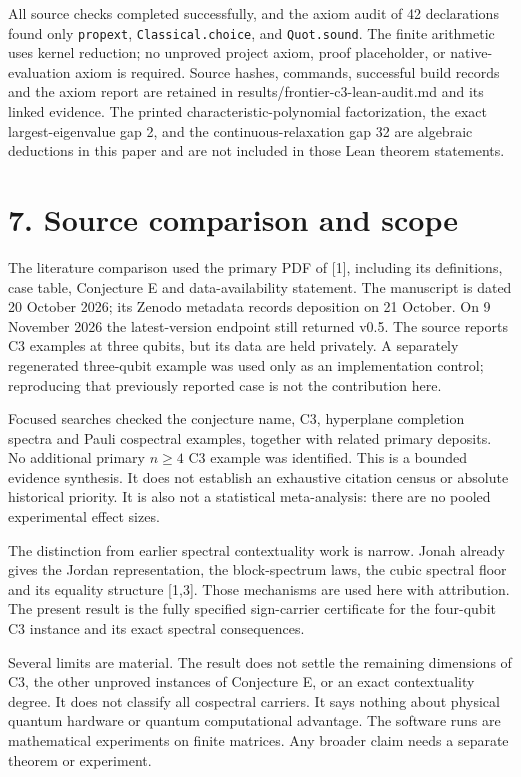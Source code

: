 \documentclass[11pt,letterpaper]{article}
\begin{document}
All source checks completed successfully, and the axiom audit of 42 declarations found only \texttt{propext}, \texttt{Classical.choice}, and \texttt{Quot.sound}. The finite arithmetic uses kernel reduction; no unproved project axiom, proof placeholder, or native-evaluation axiom is required. Source hashes, commands, successful build records and the axiom report are retained in results/frontier-c3-lean-audit.md and its linked evidence. The printed characteristic-polynomial factorization, the exact largest-eigenvalue gap 2, and the continuous-relaxation gap 32 are algebraic deductions in this paper and are not included in those Lean theorem statements.

\section{7. Source comparison and scope}\label{source-comparison-and-scope}

The literature comparison used the primary PDF of {[}1{]}, including its definitions, case table, Conjecture E and data-availability statement. The manuscript is dated 20 October 2026; its Zenodo metadata records deposition on 21 October. On 9 November 2026 the latest-version endpoint still returned v0.5. The source reports C3 examples at three qubits, but its data are held privately. A separately regenerated three-qubit example was used only as an implementation control; reproducing that previously reported case is not the contribution here.

Focused searches checked the conjecture name, C3, hyperplane completion spectra and Pauli cospectral examples, together with related primary deposits. No additional primary \(n\ge4\) C3 example was identified. This is a bounded evidence synthesis. It does not establish an exhaustive citation census or absolute historical priority. It is also not a statistical meta-analysis: there are no pooled experimental effect sizes.

The distinction from earlier spectral contextuality work is narrow. Jonah already gives the Jordan representation, the block-spectrum laws, the cubic spectral floor and its equality structure {[}1,3{]}. Those mechanisms are used here with attribution. The present result is the fully specified sign-carrier certificate for the four-qubit C3 instance and its exact spectral consequences.

Several limits are material. The result does not settle the remaining dimensions of C3, the other unproved instances of Conjecture E, or an exact contextuality degree. It does not classify all cospectral carriers. It says nothing about physical quantum hardware or quantum computational advantage. The software runs are mathematical experiments on finite matrices. Any broader claim needs a separate theorem or experiment.
\end{document}
